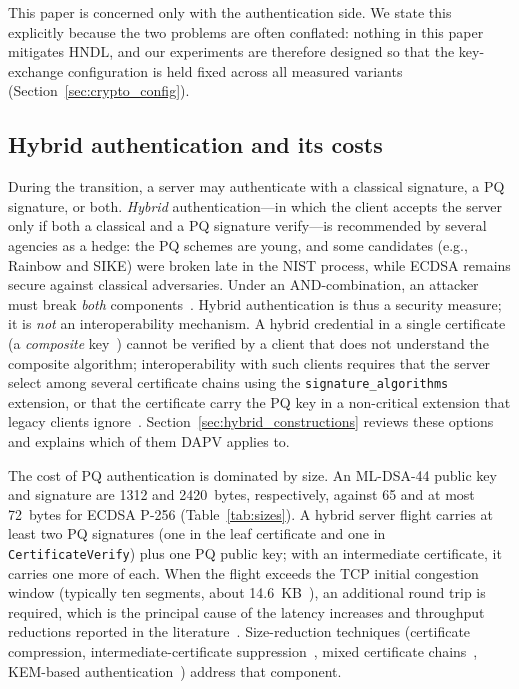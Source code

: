 \documentclass[preprint,10pt,3p]{elsarticle}
\begin{document}
This paper is concerned only with the authentication side.  We state this
explicitly because the two problems are often conflated: nothing in this
paper mitigates HNDL, and our experiments are therefore designed so that the
key-exchange configuration is held fixed across all measured variants
(Section~\ref{sec:crypto_config}).

\subsection{Hybrid authentication and its costs}

During the transition, a server may authenticate with a classical
signature, a PQ signature, or both.  \emph{Hybrid} authentication---in
which the client accepts the server only if both a classical and a PQ
signature verify---is recommended by several agencies as a hedge: the PQ
schemes are young, and some candidates (e.g., Rainbow and SIKE) were broken
late in the NIST process, while ECDSA remains secure against classical
adversaries.  Under an AND-combination, an attacker must break \emph{both}
components~\cite{Bindel2017,BindelHale2023}.  Hybrid authentication is thus
a security measure; it is \emph{not} an interoperability mechanism.  A
hybrid credential in a single certificate (a \emph{composite}
key~\cite{CompositeSigs}) cannot be verified by a client that does not
understand the composite algorithm; interoperability with such clients
requires that the server select among several certificate chains using the
\texttt{signature\_algorithms} extension, or that the certificate carry the
PQ key in a non-critical extension that legacy clients
ignore~\cite{Bindel2017}.  Section~\ref{sec:hybrid_constructions} reviews
these options and explains which of them DAPV applies to.

The cost of PQ authentication is dominated by size.  An ML-DSA-44 public
key and signature are 1312 and 2420~bytes, respectively, against 65 and at
most 72~bytes for ECDSA P-256 (Table~\ref{tab:sizes}).  A hybrid server
flight carries at least two PQ signatures (one in the leaf certificate and
one in \texttt{CertificateVerify}) plus one PQ public key; with an
intermediate certificate, it carries one more of each.  When the flight
exceeds the TCP initial congestion window (typically ten segments, about
14.6~KB~\cite{RFC6928}), an additional round trip is required, which is the
principal cause of the latency increases and throughput reductions reported
in the literature~\cite{Sikeridis2020a,Sikeridis2020b,Paquin2020,Montenegro2026}.
Size-reduction techniques (certificate compression, intermediate-certificate
suppression~\cite{KampanakisKallitsis2022,Sikeridis2022ICA}, mixed
certificate chains~\cite{Paul2022}, KEM-based
authentication~\cite{Schwabe2020KEMTLS,WiggersIETF2024}) address that
component.
\end{document}
